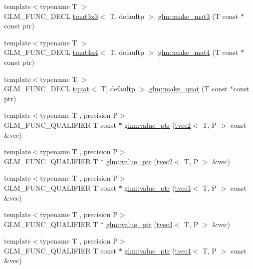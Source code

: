 \begin{DoxyCompactItemize}
\item 
{\footnotesize template$<$typename T $>$ }\\G\+L\+M\+\_\+\+F\+U\+N\+C\+\_\+\+D\+E\+CL \hyperlink{structglm_1_1tmat3x3}{tmat3x3}$<$ T, defaultp $>$ \hyperlink{group__gtc__type__ptr_gac2bc10c519ffc8db9e24f325f23787ea}{glm\+::make\+\_\+mat3} (T const $\ast$const ptr)
\item 
{\footnotesize template$<$typename T $>$ }\\G\+L\+M\+\_\+\+F\+U\+N\+C\+\_\+\+D\+E\+CL \hyperlink{structglm_1_1tmat4x4}{tmat4x4}$<$ T, defaultp $>$ \hyperlink{group__gtc__type__ptr_ga2c6e6d457cb932e1ce683e4f690a6f60}{glm\+::make\+\_\+mat4} (T const $\ast$const ptr)
\item 
{\footnotesize template$<$typename T $>$ }\\G\+L\+M\+\_\+\+F\+U\+N\+C\+\_\+\+D\+E\+CL \hyperlink{structglm_1_1tquat}{tquat}$<$ T, defaultp $>$ \hyperlink{group__gtc__type__ptr_gaadafb6600af2633e4c98cc64c72f5269}{glm\+::make\+\_\+quat} (T const $\ast$const ptr)
\item 
{\footnotesize template$<$typename T , precision P$>$ }\\G\+L\+M\+\_\+\+F\+U\+N\+C\+\_\+\+Q\+U\+A\+L\+I\+F\+I\+ER T const  $\ast$ \hyperlink{group__gtc__type__ptr_gafb01331238d8899dde700cb9b5dc6ef3}{glm\+::value\+\_\+ptr} (\hyperlink{structglm_1_1tvec2}{tvec2}$<$ T, P $>$ const \&vec)
\item 
{\footnotesize template$<$typename T , precision P$>$ }\\G\+L\+M\+\_\+\+F\+U\+N\+C\+\_\+\+Q\+U\+A\+L\+I\+F\+I\+ER T $\ast$ \hyperlink{group__gtc__type__ptr_gabd3cc713184a2093862605f5f0abb8a4}{glm\+::value\+\_\+ptr} (\hyperlink{structglm_1_1tvec2}{tvec2}$<$ T, P $>$ \&vec)
\item 
{\footnotesize template$<$typename T , precision P$>$ }\\G\+L\+M\+\_\+\+F\+U\+N\+C\+\_\+\+Q\+U\+A\+L\+I\+F\+I\+ER T const  $\ast$ \hyperlink{group__gtc__type__ptr_gac04db5d9c05bd3d50140f34f8695a08c}{glm\+::value\+\_\+ptr} (\hyperlink{structglm_1_1tvec3}{tvec3}$<$ T, P $>$ const \&vec)
\item 
{\footnotesize template$<$typename T , precision P$>$ }\\G\+L\+M\+\_\+\+F\+U\+N\+C\+\_\+\+Q\+U\+A\+L\+I\+F\+I\+ER T $\ast$ \hyperlink{group__gtc__type__ptr_gab2832ef9f1d2571fab5c7ae661e11e75}{glm\+::value\+\_\+ptr} (\hyperlink{structglm_1_1tvec3}{tvec3}$<$ T, P $>$ \&vec)
\item 
{\footnotesize template$<$typename T , precision P$>$ }\\G\+L\+M\+\_\+\+F\+U\+N\+C\+\_\+\+Q\+U\+A\+L\+I\+F\+I\+ER T const  $\ast$ \hyperlink{group__gtc__type__ptr_gaf641bc0e28d4b274826b9afed315d310}{glm\+::value\+\_\+ptr} (\hyperlink{structglm_1_1tvec4}{tvec4}$<$ T, P $>$ const \&vec)

\end{DoxyCompactItemize}
